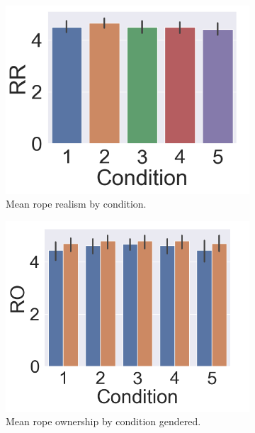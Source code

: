 \begin{figure}[H]
\begin{subfigure}[b]{0.3\textwidth}
     \includegraphics[scale=0.35]{Files/Plots/rrcond.png}
     \caption{Mean rope realism by condition.}
     \label{fig:ropeRealCond}
 \end{subfigure}
 \hspace{-5mm}
  \begin{subfigure}[b]{0.3\textwidth}
     \centering
     \includegraphics[scale=0.3]{Files/Plots/rocond_gen.png}
     \caption{Mean rope ownership by condition gendered.}
     \label{fig:ropeOwnCondGend}
 \end{subfigure}
   \begin{subfigure}[b]{0.3\textwidth}
     \centering

\end{subfigure}
\end{figure}
